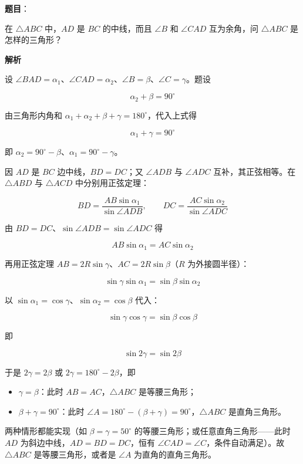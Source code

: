 \begin{answer}

\textbf{题目}：

在 $\triangle ABC$ 中，$AD$ 是 $BC$ 的中线，而且 $\angle B$ 和 $\angle CAD$ 互为余角，问 $\triangle ABC$ 是怎样的三角形？

\textbf{解析}

设 $\angle BAD=\alpha_1$、$\angle CAD=\alpha_2$、$\angle B=\beta$、$\angle C=\gamma$。题设

\nopagebreak[4]
\[
\alpha_2+\beta=90^\circ
\]

由三角形内角和 $\alpha_1+\alpha_2+\beta+\gamma=180^\circ$，代入上式得

\nopagebreak[4]
\[
\alpha_1+\gamma=90^\circ
\]

即 $\alpha_2=90^\circ-\beta$、$\alpha_1=90^\circ-\gamma$。

因 $AD$ 是 $BC$ 边中线，$BD=DC$；又 $\angle ADB$ 与 $\angle ADC$ 互补，其正弦相等。在 $\triangle ABD$ 与 $\triangle ACD$ 中分别用正弦定理：

\nopagebreak[4]
\[
BD=\frac{AB\sin\alpha_1}{\sin\angle ADB},\qquad
DC=\frac{AC\sin\alpha_2}{\sin\angle ADC}
\]

由 $BD=DC$、$\sin\angle ADB=\sin\angle ADC$ 得

\nopagebreak[4]
\[
AB\sin\alpha_1=AC\sin\alpha_2
\]

再用正弦定理 $AB=2R\sin\gamma$、$AC=2R\sin\beta$（$R$ 为外接圆半径）：

\nopagebreak[4]
\[
\sin\gamma\sin\alpha_1=\sin\beta\sin\alpha_2
\]

以 $\sin\alpha_1=\cos\gamma$、$\sin\alpha_2=\cos\beta$ 代入：

\nopagebreak[4]
\[
\sin\gamma\cos\gamma=\sin\beta\cos\beta
\]

即

\nopagebreak[4]
\[
\sin 2\gamma=\sin 2\beta
\]

于是 $2\gamma=2\beta$ 或 $2\gamma=180^\circ-2\beta$，即

\begin{itemize}
\item $\gamma=\beta$：此时 $AB=AC$，$\triangle ABC$ 是等腰三角形；
\item $\beta+\gamma=90^\circ$：此时 $\angle A=180^\circ-(\beta+\gamma)=90^\circ$，$\triangle ABC$ 是直角三角形。
\end{itemize}

两种情形都能实现（如 $\beta=\gamma=50^\circ$ 的等腰三角形；或任意直角三角形——此时 $AD$ 为斜边中线，$AD=BD=DC$，恒有 $\angle CAD=\angle C$，条件自动满足）。故 $\triangle ABC$ 是等腰三角形，或者是 $\angle A$ 为直角的直角三角形。


\end{answer}
